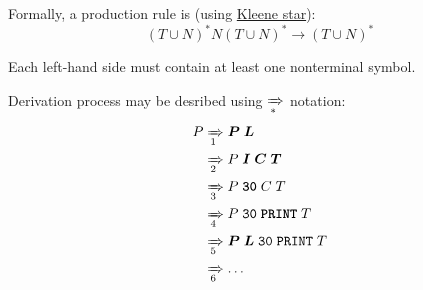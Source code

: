 \documentclass[sigsoft,12pt]{acmart}
\renewcommand\emph[1]{\ul{#1}}
\begin{document}
Formally, a production rule is (using \emph{Kleene star}):
\begin{equation*}
(T \cup N)^* N (T \cup N)^* \to (T \cup N)^*
\end{equation*}

Each left-hand side must contain at least one nonterminal symbol.

Derivation process may be desribed using $\xRightarrow[*]{}$ notation:
\begin{equation*}
\begin{split}
P &\xRightarrow[1]{} \bm{P} \; \bm{L} \\
  &\xRightarrow[2]{} P \; \bm{I} \; \bm{C} \; \bm{T} \\
  &\xRightarrow[3]{} P \; \textbf{\texttt{30}} \; C \; T \\
  &\xRightarrow[4]{} P \; \texttt{30} \; \textbf{\texttt{PRINT}} \; T \\
  &\xRightarrow[5]{} \bm{P} \; \bm{L} \; \texttt{30} \; \texttt{PRINT} \; T \\
  &\xRightarrow[6]{} \dots \\
\end{split}
\end{equation*}
\end{document}
